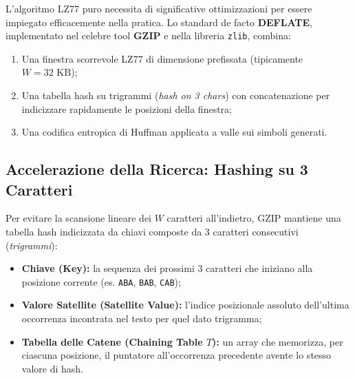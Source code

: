 L'algoritmo LZ77 puro necessita di significative ottimizzazioni per essere impiegato efficacemente nella pratica. Lo standard de facto \textbf{DEFLATE}, implementato nel celebre tool \textbf{GZIP} e nella libreria \texttt{zlib}, combina:
\begin{enumerate}
  \item Una finestra scorrevole LZ77 di dimensione prefissata (tipicamente $W = 32\text{ KB}$);
  \item Una tabella hash su trigrammi (\textit{hash on 3 chars}) con concatenazione per indicizzare rapidamente le posizioni della finestra;
  \item Una codifica entropica di Huffman applicata a valle sui simboli generati.
\end{enumerate}

\FloatBarrier
\subsection{Accelerazione della Ricerca: Hashing su 3 Caratteri}
\label{subsec:gzip-hashing}

Per evitare la scansione lineare dei $W$ caratteri all'indietro, GZIP mantiene una tabella hash indicizzata da chiavi composte da 3 caratteri consecutivi (\textit{trigrammi}):
\begin{itemize}
  \item \textbf{Chiave (Key):} la sequenza dei prossimi 3 caratteri che iniziano alla posizione corrente (es. \texttt{ABA}, \texttt{BAB}, \texttt{CAB});
  \item \textbf{Valore Satellite (Satellite Value):} l'indice posizionale assoluto dell'ultima occorrenza incontrata nel testo per quel dato trigramma;
  \item \textbf{Tabella delle Catene (Chaining Table $T$):} un array che memorizza, per ciascuna posizione, il puntatore all'occorrenza precedente avente lo stesso valore di hash.
\end{itemize}

